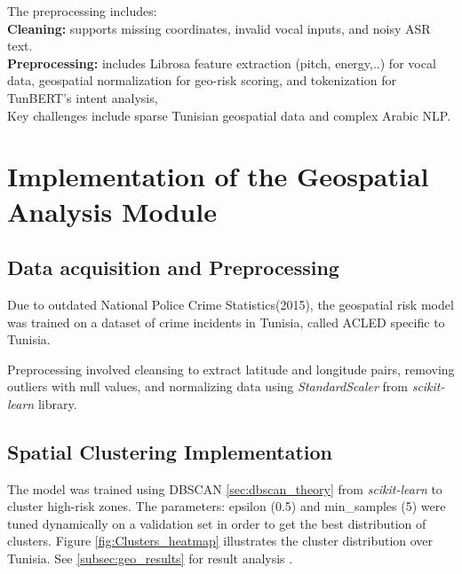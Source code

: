 \documentclass[12pt,a4paper,oneside,english]{book}
\begin{document}
{The preprocessing includes: \\
\textbf{Cleaning:} supports missing coordinates, invalid vocal inputs, and noisy ASR text.\\
\textbf{Preprocessing:} includes Librosa feature extraction (pitch, energy,..) for vocal data, geospatial normalization for geo-risk scoring, and tokenization for TunBERT's intent analysis, 
\\  Key challenges include sparse Tunisian geospatial data and complex Arabic NLP.



\section{Implementation of the Geospatial Analysis Module}
\label{geospatial_implementation}
\subsection{Data acquisition and Preprocessing}
Due to outdated National Police Crime Statistics(2015), the geospatial risk model was trained on a dataset of crime incidents in Tunisia, called ACLED \cite{raleigh2010acled} specific to Tunisia.

Preprocessing involved cleansing to extract latitude and longitude pairs, removing outliers with null values, and normalizing data using \textit{StandardScaler} from \textit{scikit-learn} library.
\subsection{Spatial Clustering Implementation}
The model was trained using DBSCAN \ref{sec:dbscan_theory} from \textit{scikit-learn} to cluster high-risk zones. 
The parameters: epsilon (0.5) and min\_samples (5) were tuned dynamically on a validation set in order to get the best distribution of clusters.
Figure \ref{fig:Clusters_heatmap} illustrates the cluster distribution over Tunisia. See \ref{subsec:geo_results} for result analysis .


}
\end{document}
